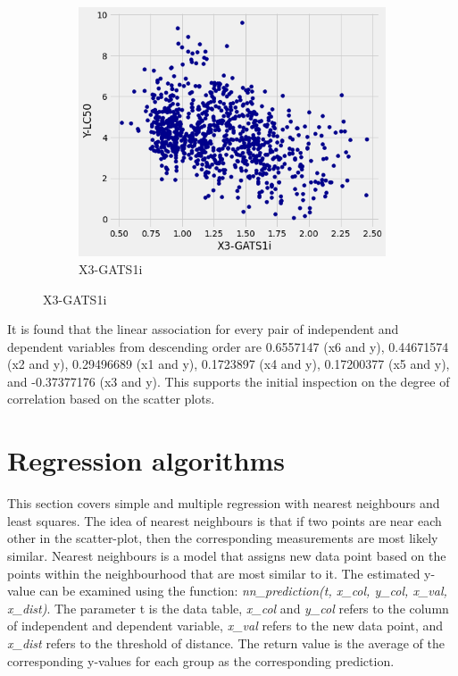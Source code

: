 \documentclass{ueacmpstyle}
\begin{document}
\begin{figure}[!htb]
    	\hfill
        \begin{subfigure}[!htb]{0.25\textwidth}
    	\centering
    	\includegraphics[width=\textwidth]{qsar_x3.png}
    	\caption{X3-GATS1i}
    	\label{fig2:x3}
    	\end{subfigure}
    	\label{fig2}	
    \end{figure}

	It is found that the linear association for every pair of independent and dependent variables from descending order are 0.6557147 (x6 and y), 0.44671574 (x2 and y), 0.29496689 (x1 and y), 0.1723897 (x4 and y), 0.17200377 (x5 and y), and -0.37377176 (x3 and y). This supports the initial inspection on the degree of correlation based on the scatter plots.

    \section{Regression algorithms}\label{sec:regression}
    
    This section covers simple and multiple regression with nearest neighbours and least squares. The idea of nearest neighbours is that if two points are near each other in the scatter-plot, then the corresponding measurements are most likely similar. Nearest neighbours is a model that assigns new data point based on the points within the neighbourhood that are most similar to it. The estimated y-value can be examined using the function: \emph{nn\_prediction(t, x\_col, y\_col, x\_val, x\_dist)}. The parameter t is the data table, \emph{x\_col} and \emph{y\_col} refers to the column of independent and dependent variable, \emph{x\_val} refers to the new data point, and \emph{x\_dist} refers to the threshold of distance. The return value is the average of the corresponding y-values for each group as the corresponding prediction.
    
\end{document}
